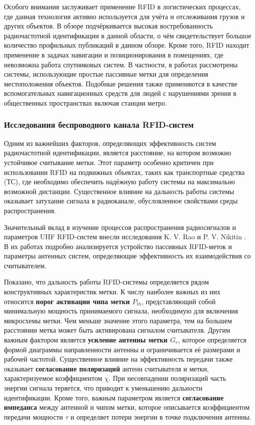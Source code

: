 \documentclass[12pt]{article}
\theoremstyle{definition}
\begin{document}
Особого внимания заслуживает применение RFID в логистических процессах, где данная технология активно используется для учёта и отслеживания грузов и других объектов. В обзоре \cite{Casella2022} подчёркивается высокая востребованность радиочастотной идентификации в данной области, о чём свидетельствует большое количество профильных публикаций в данном обзоре. Кроме того, RFID находит применение в задачах навигации и позиционирования в помещениях, где невозможна работа спутниковых систем. В частности, в работах \cite{Kunhoth2020, Smith2025, Alvarez-Merino2025} рассмотрены системы, использующие простые пассивные метки для определения местоположения объектов. Подобные решения также применяются в качестве вспомогательных навигационных средств для людей с нарушениями зрения в общественных пространствах включая станции метро.

\subsubsection{Исследования беспроводного канала RFID-систем}

Одним из важнейших факторов, определяющих эффективность систем радиочастотной идентификации, является расстояние, на котором возможно устойчивое считывание метки. Этот параметр особенно критичен при использовании RFID на подвижных объектах, таких как транспортные средства (ТС), где необходимо обеспечить надёжную работу системы на максимально возможной дистанции. Существенное влияние на дальность работы системы оказывает затухание сигнала в радиоканале, обусловленное свойствами среды распространения.

Значительный вклад в изучение процессов распространения радиосигналов и параметров UHF RFID-систем внесли исследования K. V. Rao и P. V. Nikitin \cite{Nikitin2006, Nikitin2006b, Nikitin2008}. В их работах подробно анализируется устройство пассивных RFID-меток и параметры антенных систем, определяющие эффективность их взаимодействия со считывателем.

Показано, что дальность работы RFID-системы определяется рядом конструктивных характеристик метки. К числу наиболее важных из них относится \textbf{порог активации чипа метки \(P_{th}\)}, представляющий собой минимальную мощность принимаемого сигнала, необходимую для включения микросхемы метки. Чем меньше значение этого параметра, тем на большем расстоянии метка может быть активирована сигналом считывателя. Другим важным фактором является \textbf{усиление антенны метки \(G_r\)}, которое определяется формой диаграммы направленности антенны и ограничивается её размерами и рабочей частотой. Существенное влияние на эффективность передачи также оказывает \textbf{согласование поляризаций} антенн считывателя и метки, характеризуемое коэффициентом \textbf{\(\chi\)}. При несовпадении поляризаций часть энергии сигнала теряется, что приводит к уменьшению дальности идентификации. Кроме того, важным параметром является \textbf{согласование импеданса} между антенной и чипом метки, которое описывается коэффициентом передачи мощности \textbf{\(\tau\)} и определяет потери энергии в точке подключения антенны.
\end{document}
